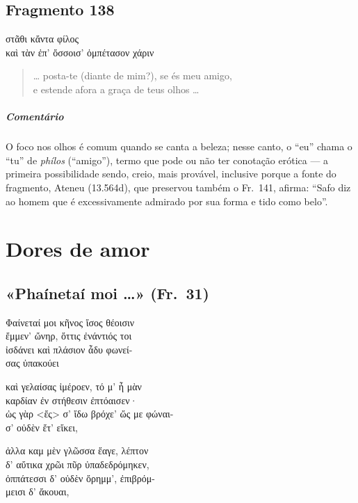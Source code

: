 {\pagebreak
\section{Fragmento 138}

\begin{gkverse}
στᾶθι \dagger{}κἄντα\dagger{} φίλος\\
καὶ τὰν ἐπ’ ὄσσοισ’ ὀμπέτασον χάριν
\end{gkverse}

\begin{verse}
\ldots{} posta-te (diante de mim?), se és meu amigo,\\
e estende afora a graça de teus olhos \ldots{}
\end{verse}

{\paragraph{Comentário} O foco nos olhos é comum quando se canta a beleza; nesse canto, o “eu” chama o
“tu” de \textit{phílos }(``amigo”), termo que pode ou não ter conotação
erótica --- a primeira possibilidade sendo, creio, mais provável, inclusive
porque a fonte do fragmento, Ateneu (13.564d), que preservou também o Fr.~141, afirma:
``Safo diz ao homem que é excessivamente admirado por sua forma e tido como belo''.}



\chapter{Dores de amor}

\section{«Phaínetaí moi \ldots{}» (Fr.~31)}

\begin{gkverse}
Φαίνεταί μοι κῆνος ἴσος θέοισιν\\
ἔμμεν’ ὤνηρ, ὄττις ἐνάντιός τοι\\
ἰσδάνει καὶ πλάσιον ἆδυ φωνεί-\\
σας ὐπακούει

καὶ γελαίσας ἰμέροεν, τό μ’ ἦ μὰν\\
καρδίαν ἐν στήθεσιν ἐπτόαισεν·\\
ὠς γὰρ <ἔς> σ’ ἴδω βρόχε’ ὤς με φώναι-\\
σ’ οὐδὲν ἔτ’ εἴκει,

ἀλλα \dagger{}καμ\dagger{} μὲν γλῶσσα \dagger{}ἔαγε\dagger{}, λέπτον\\
δ’ αὔτικα χρῶι πῦρ ὐπαδεδρόμηκεν,\\
ὀππάτεσσι δ’ οὐδὲν ὄρημμ’, ἐπιβρόμ-\\
μεισι δ’ ἄκουαι,


\end{gkverse}}
